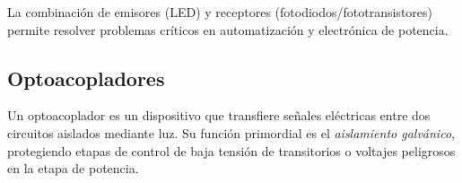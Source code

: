 La combinación de emisores (LED) y receptores (fotodiodos/fototransistores) permite resolver problemas críticos en automatización y electrónica de potencia.

\subsection{Optoacopladores}\label{sub:optoacopladores}

Un optoacoplador es un dispositivo que transfiere señales eléctricas entre dos circuitos aislados mediante luz. Su función primordial es el \emph{aislamiento galvánico}, protegiendo etapas de control de baja tensión de transitorios o voltajes peligrosos en la etapa de potencia.

\begin{marginfigure}
    \centering
    \caption[Esquema de un optoacoplador.]{Esquema interno de un optoacoplador. No existe conexión eléctrica entre la entrada y la salida; la información viaja exclusivamente en forma de fotones.}\label{fig:optoacoplador}
\end{marginfigure}


